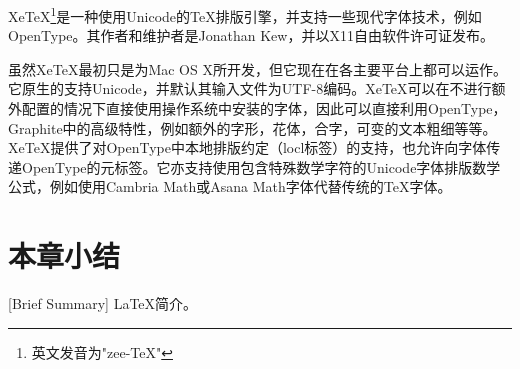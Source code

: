 Xe\TeX{}\footnote{英文发音为"zee-\TeX{}"}是一种使用Unicode的\TeX{}排版引擎，并支持一些现代字体技术，例如OpenType。其作者和维护者是Jonathan Kew，并以X11自由软件许可证发布。

虽然Xe\TeX{}最初只是为Mac OS X所开发，但它现在在各主要平台上都可以运作。它原生的支持Unicode，并默认其输入文件为UTF-8编码。Xe\TeX{}可以在不进行额外配置的情况下直接使用操作系统中安装的字体，因此可以直接利用OpenType，Graphite中的高级特性，例如额外的字形，花体，合字，可变的文本粗细等等。Xe\TeX{}提供了对OpenType中本地排版约定（locl标签）的支持，也允许向字体传递OpenType的元标签。它亦支持使用包含特殊数学字符的Unicode字体排版数学公式，例如使用Cambria Math或Asana Math字体代替传统的\TeX{}字体。

\section{本章小结}[Brief Summary]
\LaTeX{}简介。